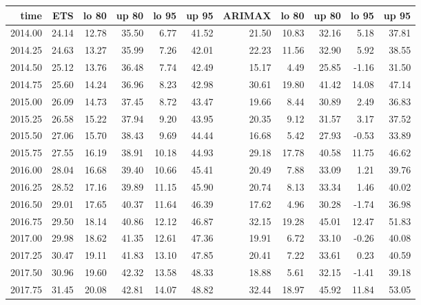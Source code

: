 \documentclass[10pt,a4paper]{article}\usepackage[]{graphicx}\usepackage[]{color}
\begin{document}
\begin{table}[ht]
\centering
\begin{tabular}{rrrrrrrrrrr}
  \hline
time & ETS  & lo 80 & up 80 & lo 95 & up 95 & ARIMAX  & lo 80 & up 80 & lo 95 & up 95 \\ 
  \hline
2014.00 & 24.14 & 12.78 & 35.50 & 6.77 & 41.52 & 21.50 & 10.83 & 32.16 & 5.18 & 37.81 \\ 
  2014.25 & 24.63 & 13.27 & 35.99 & 7.26 & 42.01 & 22.23 & 11.56 & 32.90 & 5.92 & 38.55 \\ 
  2014.50 & 25.12 & 13.76 & 36.48 & 7.74 & 42.49 & 15.17 & 4.49 & 25.85 & -1.16 & 31.50 \\ 
  2014.75 & 25.60 & 14.24 & 36.96 & 8.23 & 42.98 & 30.61 & 19.80 & 41.42 & 14.08 & 47.14 \\ 
  2015.00 & 26.09 & 14.73 & 37.45 & 8.72 & 43.47 & 19.66 & 8.44 & 30.89 & 2.49 & 36.83 \\ 
  2015.25 & 26.58 & 15.22 & 37.94 & 9.20 & 43.95 & 20.35 & 9.12 & 31.57 & 3.17 & 37.52 \\ 
  2015.50 & 27.06 & 15.70 & 38.43 & 9.69 & 44.44 & 16.68 & 5.42 & 27.93 & -0.53 & 33.89 \\ 
  2015.75 & 27.55 & 16.19 & 38.91 & 10.18 & 44.93 & 29.18 & 17.78 & 40.58 & 11.75 & 46.62 \\ 
  2016.00 & 28.04 & 16.68 & 39.40 & 10.66 & 45.41 & 20.49 & 7.88 & 33.09 & 1.21 & 39.76 \\ 
  2016.25 & 28.52 & 17.16 & 39.89 & 11.15 & 45.90 & 20.74 & 8.13 & 33.34 & 1.46 & 40.02 \\ 
  2016.50 & 29.01 & 17.65 & 40.37 & 11.64 & 46.39 & 17.62 & 4.96 & 30.28 & -1.74 & 36.98 \\ 
  2016.75 & 29.50 & 18.14 & 40.86 & 12.12 & 46.87 & 32.15 & 19.28 & 45.01 & 12.47 & 51.83 \\ 
  2017.00 & 29.98 & 18.62 & 41.35 & 12.61 & 47.36 & 19.91 & 6.72 & 33.10 & -0.26 & 40.08 \\ 
  2017.25 & 30.47 & 19.11 & 41.83 & 13.10 & 47.85 & 20.41 & 7.22 & 33.61 & 0.23 & 40.59 \\ 
  2017.50 & 30.96 & 19.60 & 42.32 & 13.58 & 48.33 & 18.88 & 5.61 & 32.15 & -1.41 & 39.18 \\ 
  2017.75 & 31.45 & 20.08 & 42.81 & 14.07 & 48.82 & 32.44 & 18.97 & 45.92 & 11.84 & 53.05 \\ 
   \hline
\end{tabular}
\end{table}
\end{document}
